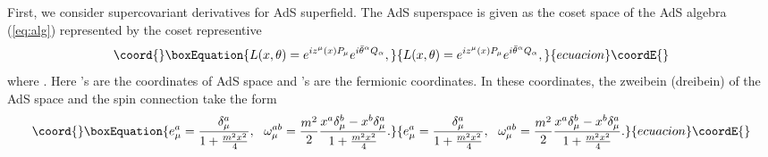 \documentclass[a4paper,12pt]{article}
\def\btheta{\bar{\theta}}
\def\dfrac#1#2{{\displaystyle\frac{#1}{#2}}}
\def\cfrac#1#2{\dfrac{\mathstrut #1}{#2}}
\begin{document}
First, we consider supercovariant derivatives for AdS superfield.
The AdS superspace is given as the coset space of 
the AdS algebra (\ref{eq:alg}) represented by the coset representive
\begin{equation}\coord{}\boxEquation{
 L(x,\theta) = e^{iz^{\mu}(x)P_{\mu}}e^{i\btheta^{\alpha} Q_{\alpha}},
}{
 L(x,\theta) = e^{iz^{\mu}(x)P_{\mu}}e^{i\btheta^{\alpha} Q_{\alpha}},
}{ecuacion}\coordE{}\end{equation}
where \coordHE{}.
Here \coordHE{}'s are the coordinates of AdS space and
\myHighlight{$\theta^{\alpha}$}\coordHE{}'s are the fermionic coordinates. In these coordinates, the
zweibein (dreibein) of the AdS space and the spin connection take the form
\begin{equation}\coord{}\boxEquation{
 e^{a}_{\mu} =
 \cfrac{\delta^{a}_{\mu}}{1+\frac{m^{2}x^{2}}{4}},\ \ 
 \omega^{ab}_{\mu} = \frac{m^{2}}{2}
   \cfrac{x^{a}\delta^{b}_{\mu}-x^{b}\delta^{a}_{\mu}}
	{1+\frac{m^{2}x^{2}}{4}}.
}{
 e^{a}_{\mu} =
 \cfrac{\delta^{a}_{\mu}}{1+\frac{m^{2}x^{2}}{4}},\ \ 
 \omega^{ab}_{\mu} = \frac{m^{2}}{2}
   \cfrac{x^{a}\delta^{b}_{\mu}-x^{b}\delta^{a}_{\mu}}
	{1+\frac{m^{2}x^{2}}{4}}.
}{ecuacion}\coordE{}\end{equation}
\end{document}
